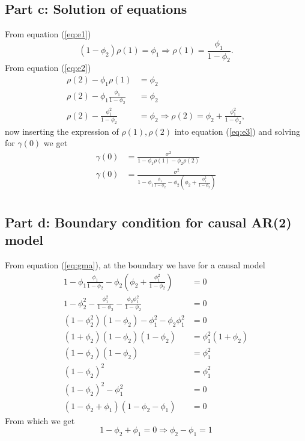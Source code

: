 \documentclass[11pt, oneside]{article}   	%
\begin{document}
\subsection{Part c: Solution of equations}
From equation (\ref{eq:e1})
\begin{equation}
(1-\phi_{2})\rho(1) = \phi_{1} \Longrightarrow \rho(1) = \frac{\phi_{1}}{1-\phi_{2}}.
\end{equation}
From equation (\ref{eq:e2})
\begin{equation}
\begin{aligned}
\rho(2) -\phi_{1}\rho(1) &= \phi_{2}\\
\rho(2) -\phi_{1} \frac{\phi_{1}}{1-\phi_{2}} &= \phi_{2}\\
\rho(2) - \frac{\phi^{2}_{1}}{1-\phi_{2}} &= \phi_{2} \Longrightarrow \rho(2) = \phi_{2}+\frac{\phi^{2}_{1}}{1-\phi_{2}},
\end{aligned}
\end{equation}
now inserting the expression of $\rho(1), \rho(2)$ into equation (\ref{eq:e3}) and solving for $\gamma(0)$ we get
\begin{equation}\label{eq:gma}
\begin{aligned}
\gamma(0) &= \frac{\sigma^{2}}{ 1-\phi_{1}\rho(1)-\phi_{2}\rho(2)}\\
\gamma(0)&= \frac{\sigma^{2}}{   1-\phi_{1}\frac{\phi_{1}}{1-\phi_{2}}-\phi_{2}\left( \phi_{2}+\frac{\phi^{2}_{1}}{1-\phi_{2}}\right)   }\\
\end{aligned}
\end{equation}

\subsection{Part d: Boundary condition for causal AR(2) model}
From equation (\ref{eq:gma}), at the boundary we have for a causal model
\begin{equation}
\begin{aligned}
1-\phi_{1}\frac{\phi_{1}}{1-\phi_{2}}-\phi_{2}\left( \phi_{2}+\frac{\phi^{2}_{1}}{1-\phi_{2}}\right) &= 0\\
1-\phi^{2}_{2} - \frac{\phi^{2}_{1}}{1-\phi_{2}} -\frac{  \phi_{2}\phi^{2}_{1}   }{1-\phi_{2}} &= 0\\
(1-\phi^{2}_{2})(1-\phi_{2} ) -\phi^{2}_{1} - \phi_{2}\phi^{2}_{1} &= 0\\
(1+\phi_{2})(1-\phi_{2})(1-\phi_{2}) &= \phi^{2}_{1}(1+\phi_{2})\\
(1-\phi_{2})(1-\phi_{2}) &= \phi^{2}_{1}\\
(1-\phi_{2})^{2} &= \phi^{2}_{1}\\
(1-\phi_{2})^{2}-\phi^{2}_{1} &=0\\
(1-\phi_{2}+\phi_{1})(1-\phi_{2}-\phi_{1})& = 0
\end{aligned}
\end{equation}
From which we get 
\begin{equation}
1-\phi_{2}+\phi_{1} = 0 \Longrightarrow \phi_{2}-\phi_{1} = 1
\end{equation}
\end{document}
